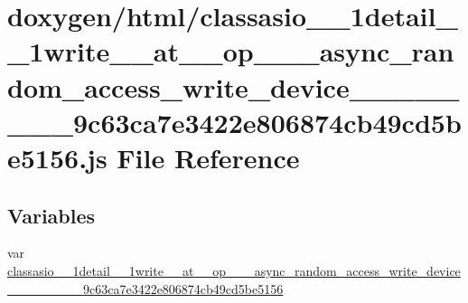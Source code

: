 \hypertarget{classasio__1__1detail__1__1write____at____op__3__01__async__random__access__write__device__00__05208cc6a534f24359bd151b3aa0cb777}{}\section{doxygen/html/classasio\+\_\+\_\+1detail\+\_\+\_\+1write\+\_\+\+\_\+at\+\_\+\+\_\+op\+\_\+\_\+\_\+async\+\_\+random\+\_\+access\+\_\+write\+\_\+device\+\_\+\_\+\_\+\_\+\_\+\_\+\_\+\_\+9c63ca7e3422e806874cb49cd5be5156.js File Reference}
\label{classasio__1__1detail__1__1write____at____op__3__01__async__random__access__write__device__00__05208cc6a534f24359bd151b3aa0cb777}
\subsection*{Variables}
\begin{DoxyCompactItemize}
\item 
var \hyperlink{classasio__1__1detail__1__1write____at____op__3__01__async__random__access__write__device__00__05208cc6a534f24359bd151b3aa0cb777_abe61023bf97f82fd215c4eedac8c6544}{classasio\+\_\+\_\+1detail\+\_\+\_\+1write\+\_\+\+\_\+at\+\_\+\+\_\+op\+\_\+\_\+\_\+async\+\_\+random\+\_\+access\+\_\+write\+\_\+device\+\_\+\_\+\_\+\_\+\_\+\_\+\_\+\_\+9c63ca7e3422e806874cb49cd5be5156}
\end{DoxyCompactItemize}


